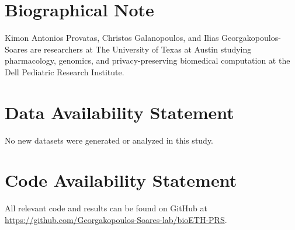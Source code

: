\documentclass[10pt]{article}
\begin{document}
\section*{Biographical Note}
Kimon Antonios Provatas, Christos Galanopoulos, and Ilias Georgakopoulos-Soares are researchers at The University of Texas at Austin studying pharmacology, genomics, and privacy-preserving biomedical computation at the Dell Pediatric Research Institute.

\section*{Data Availability Statement}
No new datasets were generated or analyzed in this study.

\section*{Code Availability Statement}
All relevant code and results can be found on GitHub at \url{https://github.com/Georgakopoulos-Soares-lab/bioETH-PRS}.



\end{document}
